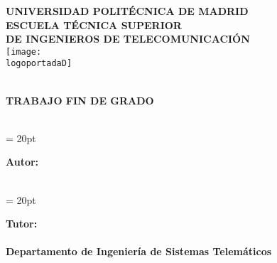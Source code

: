 \newpage
\changepage{2in}{}{}{-0.2in}{}{-0.6in}{}{}{}

	\thispagestyle{empty}
	\begin{center}

	\renewcommand{\baselinestretch}{2.0}

\textbf{\Large UNIVERSIDAD POLIT\'{E}CNICA DE MADRID}\\
\textbf{\large ESCUELA T\'{E}CNICA SUPERIOR \\DE INGENIEROS DE TELECOMUNICACI\'{O}N}\\

	\vspace{1.0cm}
	\texttt{[image: \\logoportadaD]}
	\vspace{0.5cm}

	\textbf{\Large \grado}\\
	\vspace{0.5cm}
	\textbf{TRABAJO FIN DE GRADO}\\

	\vspace{2.5cm}

        \baselineskip=20pt
        \textbf{\textbf{\Large \titulo}}\\

        \vspace{3.5cm}
        \baselineskip = 20pt


        \textbf{\Large Autor:} \\
	\textbf {\Large \autor} \\

  \vspace{1cm}

  \baselineskip = 20pt
        
	\textbf{\Large Tutor:} \\
	\textbf{\Large \tutor} \\
	\textbf{\Large Departamento de Ingeniería de Sistemas Telemáticos} \\

  \vspace{1cm}
        \textbf{\Large \fecha} \\

	\end{center}

\afterpage{\blankpage}
